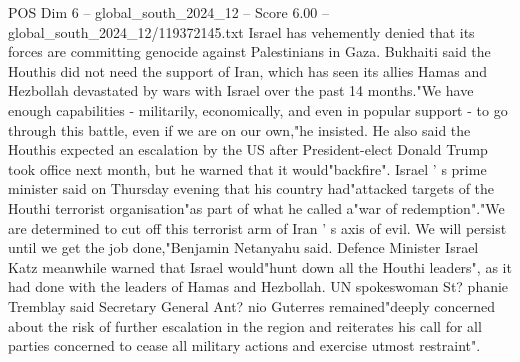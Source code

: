 \begin{textsample}{POS Dim 6 – global\_south\_2024\_12 – Score 6.00 – global\_south\_2024\_12/119372145.txt}
Israel has vehemently denied that its forces are committing genocide against Palestinians in Gaza.
Bukhaiti said the Houthis did not need the support of Iran, which has seen its allies Hamas and Hezbollah devastated by wars with Israel over the past 14 months."We have enough capabilities - militarily, economically, and even in popular support - to go through this battle, even if we are on our own,"he insisted.
He also said the Houthis expected an escalation by the US after President-elect Donald Trump took office next month, but he warned that it would"backfire".
Israel ' s prime minister said on Thursday evening that his country had"attacked targets of the Houthi terrorist organisation"as part of what he called a"war of redemption"."We are determined to cut off this terrorist arm of Iran ' s axis of evil.
We will persist until we get the job done,"Benjamin Netanyahu said.
Defence Minister Israel Katz meanwhile warned that Israel would"hunt down all the Houthi leaders", as it had done with the leaders of Hamas and Hezbollah.
UN spokeswoman St? phanie Tremblay said Secretary General Ant? nio Guterres remained"deeply concerned about the risk of further escalation in the region and reiterates his call for all parties concerned to cease all military actions and exercise utmost restraint".

\end{textsample}
